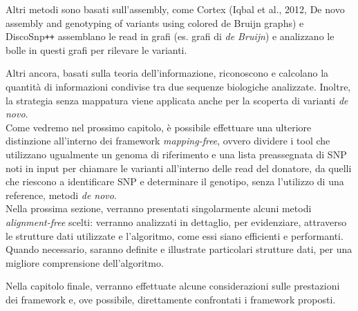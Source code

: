 \documentclass[../main.tex]{subfiles}
\begin{document}
Altri metodi sono basati sull'assembly, come Cortex (Iqbal et al., 2012, De novo assembly and genotyping of variants using colored de Bruijn graphs) e DiscoSnp\texttt{++} \cite{peterlongo2017discosnp++} assemblano le read in grafi (es. grafi di \textit{de Bruijn}) e analizzano le bolle in questi grafi per rilevare le varianti. 

Altri ancora, basati sulla teoria dell'informazione, riconoscono e calcolano la quantità di informazioni condivise tra due sequenze biologiche analizzate. Inoltre, la strategia senza mappatura viene applicata anche per la scoperta di varianti \textit{de novo}.\\


\noindent
Come vedremo nel prossimo capitolo, è possibile effettuare una ulteriore distinzione all'interno dei framework \textit{mapping-free}, ovvero dividere i tool che utilizzano ugualmente un genoma di riferimento e una lista preassegnata di SNP noti in input per chiamare le varianti all'interno delle read del donatore, da quelli che riescono a identificare SNP e determinare il genotipo, senza l'utilizzo di una reference, metodi \textit{de novo}.\\




\noindent
Nella prossima sezione, verranno presentati singolarmente alcuni metodi \textit{alignment-free} scelti: verranno analizzati in dettaglio, per evidenziare, attraverso le strutture dati utilizzate e l'algoritmo, come essi siano efficienti e performanti. Quando necessario, saranno definite e illustrate particolari strutture dati, per una migliore comprensione dell'algoritmo.

Nella capitolo finale, verranno effettuate alcune considerazioni sulle prestazioni dei framework e, ove possibile, direttamente confrontati i framework proposti.


\end{document}
